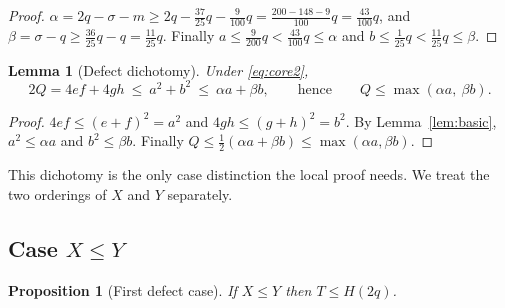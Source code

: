 \documentclass[11pt]{amsart}
\newtheorem{lemma}[theorem]{Lemma}
\newtheorem{proposition}[theorem]{Proposition}
\theoremstyle{definition}
\theoremstyle{remark}
\begin{document}
\begin{proof}
$\alpha=2q-\sigma-m\ge2q-\frac{37}{25}q-\frac{9}{100}q=\frac{200-148-9}{100}q=\frac{43}{100}q$, and $\beta=\sigma-q\ge\frac{36}{25}q-q=\frac{11}{25}q$. Finally $a\le\frac{9}{200}q<\frac{43}{100}q\le\alpha$ and $b\le\frac1{25}q<\frac{11}{25}q\le\beta$.
\end{proof}

\begin{lemma}[Defect dichotomy]\label{lem:dichotomy}
Under \eqref{eq:core2},
\begin{equation}\label{eq:dicho}
2Q=4ef+4gh\ \le\ a^2+b^2\ \le\ \alpha a+\beta b,
\qquad\text{hence}\qquad
Q\le\max(\alpha a,\ \beta b).
\end{equation}
\end{lemma}

\begin{proof}
$4ef\le(e+f)^2=a^2$ and $4gh\le(g+h)^2=b^2$. By Lemma~\ref{lem:basic}, $a^2\le\alpha a$ and $b^2\le\beta b$. Finally $Q\le\frac12(\alpha a+\beta b)\le\max(\alpha a,\beta b)$.
\end{proof}

This dichotomy is the only case distinction the local proof needs. We treat the two orderings of $X$ and $Y$ separately.

\subsection{Case \texorpdfstring{$X\le Y$}{X <= Y}}\label{ssec:caseA}

\begin{proposition}[First defect case]\label{prop:caseA}
If $X\le Y$ then $T\le H(2q)$.
\end{proposition}
\end{document}
